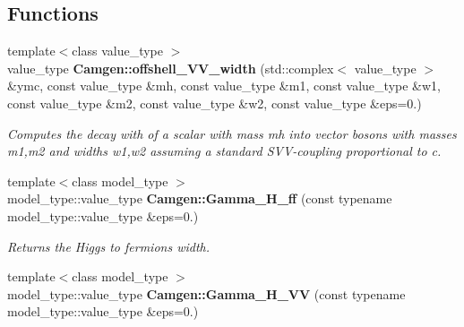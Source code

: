 \subsection*{Functions}
\begin{DoxyCompactItemize}
\item 
{\footnotesize template$<$class value\+\_\+type $>$ }\\value\+\_\+type {\bfseries Camgen\+::offshell\+\_\+\+V\+V\+\_\+width} (std\+::complex$<$ value\+\_\+type $>$ \&ymc, const value\+\_\+type \&mh, const value\+\_\+type \&m1, const value\+\_\+type \&w1, const value\+\_\+type \&m2, const value\+\_\+type \&w2, const value\+\_\+type \&eps=0.)
\begin{DoxyCompactList}\small\item\em Computes the decay with of a scalar with mass mh into vector bosons with masses m1,m2 and widths w1,w2 assuming a standard S\+V\+V-\/coupling proportional to c. \end{DoxyCompactList}\item 
\hypertarget{a00878_a3a0f56f55a981e974a89187a026f0083}{}{\footnotesize template$<$class model\+\_\+type $>$ }\\model\+\_\+type\+::value\+\_\+type {\bfseries Camgen\+::\+Gamma\+\_\+\+H\+\_\+ff} (const typename model\+\_\+type\+::value\+\_\+type \&eps=0.)\label{a00878_a3a0f56f55a981e974a89187a026f0083}

\begin{DoxyCompactList}\small\item\em Returns the Higgs to fermions width. \end{DoxyCompactList}\item 
\hypertarget{a00878_ab09b39e241f436ff21bcbae1cb37dfac}{}{\footnotesize template$<$class model\+\_\+type $>$ }\\model\+\_\+type\+::value\+\_\+type {\bfseries Camgen\+::\+Gamma\+\_\+\+H\+\_\+\+V\+V} (const typename model\+\_\+type\+::value\+\_\+type \&eps=0.)\label{a00878_ab09b39e241f436ff21bcbae1cb37dfac}


\end{DoxyCompactItemize}
